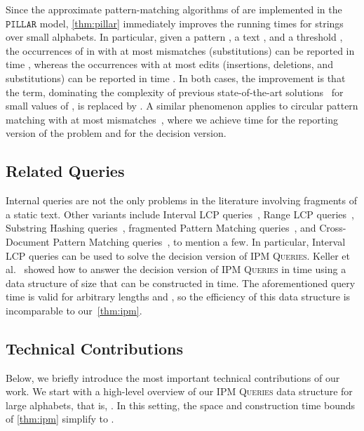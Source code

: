 \documentclass[a4paper]{article}
\theoremstyle{definition}
\theoremstyle{remark}
\newcommand{\IPM}{\textsc{IPM Queries}\xspace}
\newcommand{\pillar}{\ensuremath{\mathtt{PILLAR}}\xspace}
\begin{document}
Since the approximate pattern-matching algorithms of \cite{DBLP:conf/focs/Charalampopoulos20,DBLP:conf/focs/Charalampopoulos22,DBLP:conf/esa/Charalampopoulos22} are implemented in the \pillar model,
\cref{thm:pillar} immediately improves the running times for strings over small alphabets.
In particular, given a pattern , a text , and a threshold , the occurrences of  in  with at most  mismatches (substitutions) can be reported in time ,
whereas the occurrences with at most  edits (insertions, deletions, and substitutions) can be reported in time . In both cases, the improvement is that the  term, dominating the complexity of previous state-of-the-art solutions~\cite{DBLP:conf/stoc/ChanGKKP20,DBLP:conf/focs/Charalampopoulos22} for small values of , is replaced by . 
A similar phenomenon applies to circular pattern matching with at most  mismatches~\cite{DBLP:conf/esa/Charalampopoulos22}, where we achieve  time for the reporting version of the problem and  for the decision version.

\subsection{Related Queries}\label{sec:related}
Internal queries are not the only problems in the literature involving fragments of a static text.
Other variants include
Interval LCP queries~\cite{DBLP:conf/soda/CormodeM05,DBLP:journals/tcs/KellerKFL14},
Range LCP queries~\cite{DBLP:conf/cocoon/Abedin0HNSST18,RangeLCP,DBLP:conf/spire/AmirLT15,DBLP:conf/spire/PatilST13},
Substring Hashing queries~\cite{DBLP:conf/cpm/FarachM96,DBLP:conf/esa/Gawrychowski11,DBLP:conf/esa/GawrychowskiLN14},
fragmented Pattern Matching queries~\cite{DBLP:journals/talg/AmirLLS07,DBLP:conf/esa/GawrychowskiLN14},
and Cross-Document Pattern Matching queries~\cite{DBLP:journals/jda/KopelowitzKNS14}, to mention a few.
In particular, Interval LCP queries can be used to solve the decision version of \IPM.
Keller et al.~\cite{DBLP:journals/tcs/KellerKFL14}
showed how to answer the decision version of \IPM in  time
using a data structure of size  that can be constructed in  time.
The aforementioned query time is valid for arbitrary lengths  and ,
so the efficiency of this data structure is incomparable to our~\cref{thm:ipm}.

\subsection{Technical Contributions}\label{sec:techniques}
Below, we briefly introduce the most important technical contributions of our work.
We start with a high-level overview of our \IPM data structure for large alphabets,
that is, .
In this setting, the space and construction time bounds of \cref{thm:ipm} simplify to .
\end{document}
